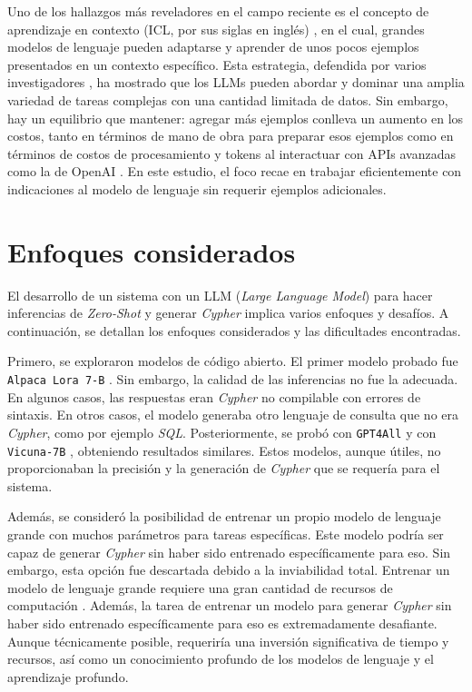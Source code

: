 Uno de los hallazgos más reveladores en el campo reciente es el concepto de aprendizaje en contexto (ICL, por sus siglas en inglés) \cite{icldefinition}, en el cual, grandes modelos de lenguaje pueden adaptarse y aprender de unos pocos ejemplos presentados en un contexto específico. Esta estrategia, defendida por varios investigadores \cite{sunetal2023} \cite{minetal2022} \cite{pourrezandrafiei2023}, ha mostrado que los LLMs pueden abordar y dominar una amplia variedad de tareas complejas con una cantidad limitada de datos. Sin embargo, hay un equilibrio que mantener: agregar más ejemplos conlleva un aumento en los costos, tanto en términos de mano de obra para preparar esos ejemplos como en términos de costos de procesamiento y tokens al interactuar con APIs avanzadas como la de OpenAI \cite{openaiapi}. En este estudio, el foco recae en trabajar eficientemente con indicaciones al modelo de lenguaje sin requerir ejemplos adicionales.

\section{Enfoques considerados} \label{considered_approaches}

El desarrollo de un sistema con un LLM (\textit{Large Language Model}) para hacer inferencias de \textit{Zero-Shot} y generar \textit{Cypher} implica varios enfoques y desafíos. A continuación, se detallan los enfoques considerados y las dificultades encontradas.

Primero, se exploraron modelos de código abierto. El primer modelo probado fue \texttt{Alpaca Lora 7-B} \cite{alpacalora}. Sin embargo, la calidad de las inferencias no fue la adecuada. En algunos casos, las respuestas eran \textit{Cypher} no compilable con errores de sintaxis. En otros casos, el modelo generaba otro lenguaje de consulta que no era \textit{Cypher}, como por ejemplo \textit{SQL}. Posteriormente, se probó con \texttt{GPT4All} \cite{gpt4all} y con \texttt{Vicuna-7B} \cite{vicuna7b}, obteniendo resultados similares. Estos modelos, aunque útiles, no proporcionaban la precisión y la generación de \textit{Cypher} que se requería para el sistema.

Además, se consideró la posibilidad de entrenar un propio modelo de lenguaje grande con muchos parámetros para tareas específicas. Este modelo podría ser capaz de generar \textit{Cypher} sin haber sido entrenado específicamente para eso. Sin embargo, esta opción fue descartada debido a la inviabilidad total. Entrenar un modelo de lenguaje grande requiere una gran cantidad de recursos de computación \cite{finetunellms}. Además, la tarea de entrenar un modelo para generar \textit{Cypher} sin haber sido entrenado específicamente para eso es extremadamente desafiante. Aunque técnicamente posible, requeriría una inversión significativa de tiempo y recursos, así como un conocimiento profundo de los modelos de lenguaje y el aprendizaje profundo.

